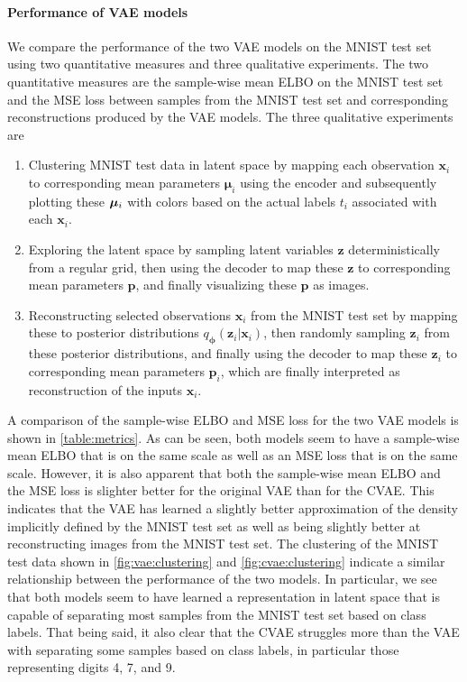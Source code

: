 \paragraph{Performance of VAE models}
We compare the performance of the two VAE models on the MNIST test set using two quantitative measures and three qualitative experiments. The two quantitative measures are the sample-wise mean ELBO on the MNIST test set and the MSE loss between samples from the MNIST test set and corresponding reconstructions produced by the VAE models. The three qualitative experiments are
\begin{enumerate}
    \item Clustering MNIST test data in latent space by mapping each observation $\bm{x}_i$ to corresponding mean parameters $\bm{\mu}_i$ using the encoder and subsequently plotting these $\bm{\mu_}i$ with colors based on the actual labels $t_i$ associated with each $\bm{x}_i$.
    \item Exploring the latent space by sampling latent variables $\bm{z}$ deterministically from a regular grid, then using the decoder to map these $\bm{z}$ to corresponding mean parameters $\bm{p}$,  and finally visualizing these $\bm{p}$ as images.
    \item Reconstructing selected observations $\bm{x}_i$ from the MNIST test set by mapping these to posterior distributions $q_{\bm{\phi}}(\bm{z}_i|\bm{x}_i)$, then randomly sampling $\bm{z}_i$ from these posterior distributions, and finally using the decoder to map these $\bm{z}_i$ to corresponding mean parameters $\bm{p}_i$, which are finally interpreted as reconstruction of the inputs $\bm{x}_i$.
\end{enumerate}
A comparison of the sample-wise ELBO and MSE loss for the two VAE models is shown in \cref{table:metrics}. As can be seen, both models seem to have a sample-wise mean ELBO that is on the same scale as well as an MSE loss that is on the same scale. However, it is also apparent that both the sample-wise mean ELBO and the MSE loss is slighter better for the original VAE than for the CVAE\@. This indicates that the VAE has learned a slightly better approximation of the density implicitly defined by the MNIST test set as well as being slightly better at reconstructing images from the MNIST test set. The clustering of the MNIST test data shown in \cref{fig:vae:clustering} and \cref{fig:cvae:clustering} indicate a similar relationship between the performance of the two models. In particular, we see that both models seem to have learned a representation in latent space that is capable of separating most samples from the MNIST test set based on class labels. That being said, it also clear that the CVAE struggles more than the VAE with separating some samples based on class labels, in particular those representing digits 4, 7, and 9. 

